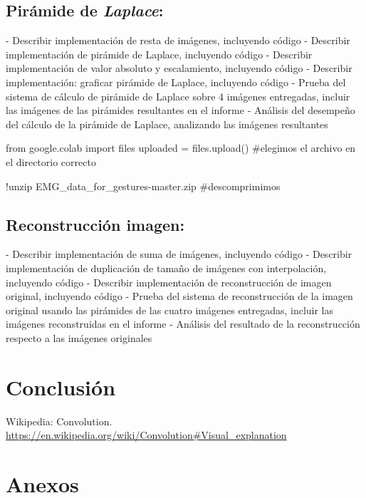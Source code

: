 \subsection{Pirámide de \textit{Laplace}:}
- Describir implementación de resta de imágenes, incluyendo código
- Describir implementación de pirámide de Laplace, incluyendo código
- Describir implementación de valor absoluto y escalamiento, incluyendo código
- Describir implementación: graficar pirámide de Laplace, incluyendo código
- Prueba del sistema de cálculo de pirámide de Laplace sobre 4 imágenes entregadas, incluir las
imágenes de las pirámides resultantes en el informe
- Análisis del desempeño del cálculo de la pirámide de Laplace, analizando las imágenes resultantes

\begin{python}
  from google.colab import files
  uploaded = files.upload() #elegimos el archivo en el directorio correcto
  
  !unzip EMG_data_for_gestures-master.zip #descomprimimos
  \end{python}

\subsection{Reconstrucción imagen:}
- Describir implementación de suma de imágenes, incluyendo código
- Describir implementación de duplicación de tamaño de imágenes con interpolación, incluyendo
código
- Describir implementación de reconstrucción de imagen original, incluyendo código
- Prueba del sistema de reconstrucción de la imagen original usando las pirámides de las cuatro
imágenes entregadas, incluir las imágenes reconstruidas en el informe
- Análisis del resultado de la reconstrucción respecto a las imágenes originales


\section{Conclusión}


\newpage
\begin{thebibliography}{X}
     Wikipedia: Convolution. \\
    \url{https://en.wikipedia.org/wiki/Convolution#Visual_explanation} 

\end{thebibliography}

\section{Anexos}
